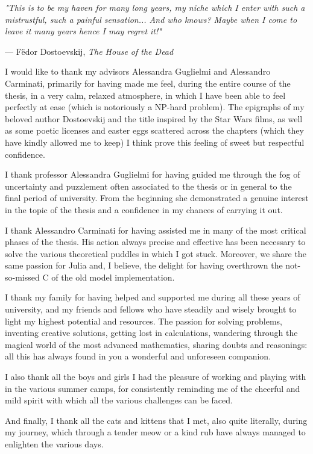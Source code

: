 \documentclass[12pt,	%
	a4paper,		%
	twoside,		%
	openright,		%
	titlepage,%
	]{book}
\theoremstyle{definition}
\begin{document}
\setlength{}
\epigraph{\itshape 
"This is to be my haven for many long years, my niche which I enter with such a mistrustful, such a painful sensation... And who knows? Maybe when I come to leave it many years hence I may regret it!"
}{--- F\"{e}dor Dostoevskij, \textit{The House of the Dead}}

I would like to thank my advisors Alessandra Guglielmi and Alessandro Carminati, primarily for having made me feel, during the entire course of the thesis, in a very calm, relaxed atmosphere, in which I have been able to feel perfectly at ease (which is notoriously a NP-hard problem). The epigraphs of my beloved author Dostoevskij and the title inspired by the Star Wars films, as well as some poetic licenses and easter eggs scattered across the chapters (which they have kindly allowed me to keep) I think prove this feeling of sweet but respectful confidence.

I thank professor Alessandra Guglielmi for having guided me through the fog of uncertainty and puzzlement often associated to the thesis or in general to the final period of university. From the beginning she demonstrated a genuine interest in the topic of the thesis and a confidence in my chances of carrying it out.

I thank Alessandro Carminati for having assisted me in many of the most critical phases of the thesis. His action always precise and effective has been necessary to solve the various theoretical puddles in which I got stuck. Moreover, we share the same passion for Julia and, I believe, the delight for having overthrown the not-so-missed C of the old model implementation.

I thank my family for having helped and supported me during all these years of university, and my friends and fellows who have steadily and wisely brought to light my highest potential and resources. The passion for solving problems, inventing creative solutions, getting lost in calculations, wandering through the magical world of the most advanced mathematics, sharing doubts and reasonings: all this has always found in you a wonderful and unforeseen companion.

I also thank all the boys and girls I had the pleasure of working and playing with in the various summer camps, for consistently reminding me of the cheerful and mild spirit with which all the various challenges can be faced.

\newpage
And finally, I thank all the cats and kittens that I met, also quite literally, during my journey, which through a tender meow or a kind rub have always managed to enlighten the various days.
\end{document}

